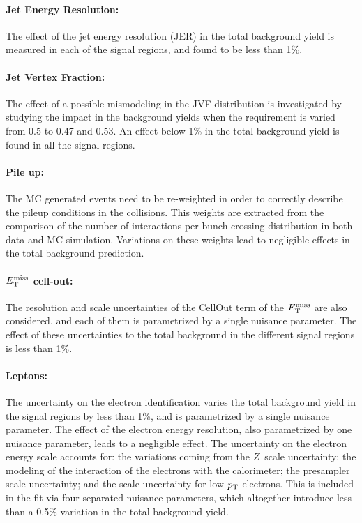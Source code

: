 \paragraph{Jet Energy Resolution:} The effect of the jet energy resolution (JER) in the total background yield is measured in each of the signal regions, and found to be less than 1\%.

\paragraph{Jet Vertex Fraction:} The effect of a possible mismodeling in the JVF distribution is investigated by studying the impact in the background yields when the requirement is varied from 0.5 to 0.47 and 0.53.
An effect below 1\% in the total background yield is found in all the signal regions.

\paragraph{Pile up:} The MC generated events need to be re-weighted in order to correctly describe the pileup conditions in the collisions.
This weights are extracted from the comparison of the number of interactions per bunch crossing distribution in both data and MC simulation.
Variations on these weights lead to negligible effects in the total background prediction.

\paragraph{$E_{\mathrm{T}}^{\mathrm{miss}}$ cell-out:}The resolution and scale uncertainties of the CellOut term of the $E_{\mathrm{T}}^{\mathrm{miss}}$ are also considered, and each of them is parametrized by a single nuisance parameter.
The effect of these uncertainties to the total background in the different signal regions is less than 1\%.

\paragraph{Leptons:} The uncertainty on the electron identification varies the total background yield in the signal regions by less than 1\%, and is parametrized by a single nuisance parameter.
The effect of the electron energy resolution, also parametrized by one nuisance parameter, leads to a negligible effect.
The uncertainty on the electron energy scale accounts for: the variations coming from the $Z$~scale uncertainty; the modeling of the interaction of the electrons with the calorimeter; the presampler scale uncertainty; and the scale uncertainty for low-$p_{\mathrm{T}}$ electrons.
This is included in the fit via four separated nuisance parameters, which altogether introduce less than a 0.5\% variation in the total background yield.

